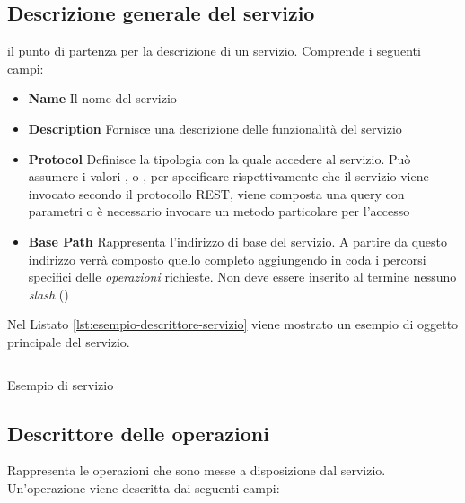 \subsection{Descrizione generale del servizio\label{sec:oggetto-principale-servizi}}

\upe il punto di partenza per la descrizione di un servizio. Comprende i seguenti campi:

\begin{itemize}
	\item \textbf{Name}
	Il nome del servizio
	\item \textbf{Description}
	Fornisce una descrizione delle funzionalità del servizio
	\item \textbf{Protocol}
	Definisce la tipologia con la quale accedere al servizio. Può assumere i valori ,  o , per specificare rispettivamente che il servizio viene invocato secondo il protocollo REST, viene composta una query con parametri o è necessario invocare un metodo particolare per l'accesso
	\item \textbf{Base Path}
	Rappresenta l'indirizzo di base del servizio. A partire da questo indirizzo verrà composto quello completo aggiungendo in coda i percorsi specifici delle \emph{operazioni} richieste. Non deve essere inserito al termine nessuno \emph{slash} (\virgolette{/})
\end{itemize}

Nel Listato \ref{lst:esempio-descrittore-servizio} viene mostrato un esempio di oggetto principale del servizio.

\begin{listing}[h]
	\inputminted{json}{5-implementazione-backend/Codice/esempio_descrittore_servizio.json}
	\caption{Esempio di servizio}
	\label{lst:esempio-descrittore-servizio}
\end{listing}

\subsection{Descrittore delle operazioni\label{sec:descrittore-operazioni}}

Rappresenta le operazioni che sono messe a disposizione dal servizio. Un'o\-pe\-ra\-zio\-ne viene descritta dai seguenti campi:

